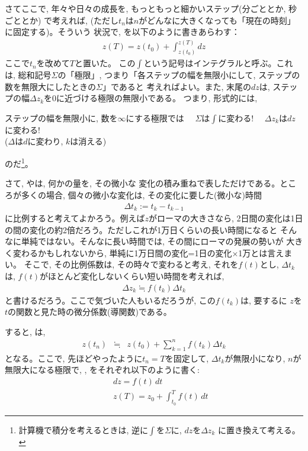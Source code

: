 さてここで, 年々や日々の成長を, もっともっと細かいステップ(分ごととか, 秒ごととか)
で考えれば, 
(ただし$t_n$は$n$がどんなに大きくなっても「現在の時刻」に固定する)。そういう
状況で, を以下のように書きあらわす：
\begin{eqnarray}
z(T)=z(t_0)+\int^{z(T)}_{z(t_0)} dz\label{eq:integral_dz}
\end{eqnarray}
ここで$t_n$を改めて$T$と置いた。
この$\int$という記号はインテグラルと呼ぶ。これは, 総和記号$\Sigma$の「極限」, 
つまり「各ステップの幅を無限小にして, ステップの数を無限大にしたときの$\Sigma$」であると
考えればよい。また, 末尾の$dz$は, ステップの幅$\Delta z_k$を0に近づける極限の無限小である。
つまり, 形式的には, 
\begin{itembox}{ステップの幅を無限小に, 数を$\infty$にする極限では}
$\quad$$\Sigma$は$\int$に変わる! 
$\quad$$\Delta z_k$は$dz$に変わる!\\
($\Delta$は$d$に変わり, $k$は消える)
\end{itembox}
のだ\footnote{計算機で積分を考えるときは, 逆に$\int$を$\Sigma$に, $dz$を$\Delta z_k$
に置き換えて考える。}。

さて, やは, 何かの量を, その微小な
変化の積み重ねで表しただけである。ところが多くの場合, 個々の微小な変化は, その変化に要した(微小な)時間
\begin{eqnarray}\Delta t_k:=t_k-t_{k-1}\end{eqnarray}
に比例すると考えてよかろう。例えば$z$がローマの大きさなら, 
2日間の変化は1日の間の変化の約2倍だろう。ただしこれが1万日くらいの長い時間になると
そんなに単純ではない。そんなに長い時間では, その間にローマの発展の勢いが
大きく変わるかもしれないから, 単純に1万日間の変化=1日の変化×1万とは言えまい。
そこで, その比例係数は, その時々で変わると考え, それを$f(t)$とし, 
$\Delta t_k$は, $f(t)$がほとんど変化しないくらい短い時間を考えれば, 
\begin{eqnarray}\Delta z_k\fallingdotseq f(t_k)\Delta t_k\label{eq:fdeltat}\end{eqnarray}
と書けるだろう。ここで気づいた人もいるだろうが, この$f(t_k)$は, 要するに
$z$を$t$の関数と見た時の微分係数(導関数)である。

すると, は, 
\begin{eqnarray}
z(t_n)&\fallingdotseq&z(t_0)+\sum^{n}_{k=1}f(t_k)\Delta t_k\label{eq:sum_fdeltat}
\end{eqnarray}
となる。ここで, 先ほどやったように$t_n=T$を固定して, $\Delta t_k$が無限小になり, $n$が無限大になる極限で, 
, 
をそれぞれ以下のように書く:
\begin{eqnarray}
&&dz = f(t) \,dt\\
&&z(T)=z_0+\int^{T}_{t_0} f(t) \,dt\label{eq:WhatIsIntegral1}
\end{eqnarray}

